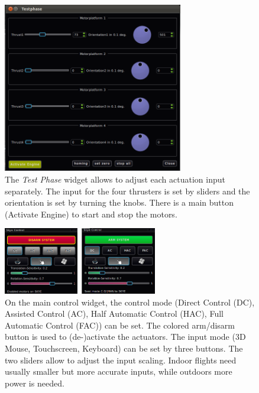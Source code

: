 \begin{figure}[H] %
	\begin{center}
		\includegraphics[width=0.7\textwidth]{qgc_test_phase}
		\caption[Test Phase realization]{The \textit{Test Phase} widget allows to adjust each actuation input separately. The input for the four thrusters is set by sliders and the orientation is set by turning the knobs. There is a main button (Activate Engine) to start and stop the motors.}  
		\label{figure:qgc_test_phase}
	\end{center}
\end{figure}

\begin{figure}[H] %
	\begin{center}
		\includegraphics[width=0.6\textwidth]{qgc_skye_control}
		\caption[Main control widget]{On the main control widget, the control mode (Direct Control (DC), Assisted Control (AC), Half Automatic Control (HAC), Full Automatic Control (FAC)) can be set. The colored arm/disarm button is used to (de-)activate the actuators. The input mode (3D Mouse, Touchscreen, Keyboard) can be set by three buttons. The two sliders allow to adjust the input scaling. Indoor flights need usually smaller but more accurate inputs, while outdoors more power is needed.}  
		\label{figure:qgc_skye_control}		
	\end{center}
\end{figure}

